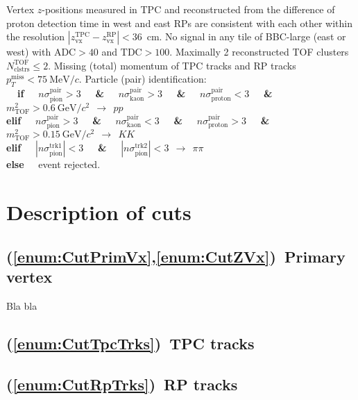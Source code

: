 \begin{enumerate}[label=C\arabic*]
\begin{enumerate}[label=\theenumi.\arabic*]
    \end{enumerate}
 \itemm Vertex $z$-positions measured in TPC and reconstructed from the difference of proton detection time in west and east RPs are consistent with each other within the resolution $|z_{\textrm{vx}}^{\textrm{TPC}}-z_{\textrm{vx}}^{\textrm{RP}}|<36$~cm.\label{enum:CutDeltaZVx}
 \itemm No signal in any tile of BBC-large (east or west) with $\textrm{ADC}>40$ and $\textrm{TDC}>100$.\label{enum:CutBbcLarge}
 \itemm Maximally 2 reconstructed TOF clusters $N^{\textrm{TOF}}_{\textrm{clstrs}}\leq 2$.\label{enum:CutTofClusters}
 \itemm Missing (total) momentum of TPC tracks and RP tracks $p_{T}^{\textrm{miss}}<75~\textrm{MeV}/c$.\label{enum:CutMissingPt}
 \itemm Particle (pair) identification:\label{enum:CutPid}\\
 \textbf{~~if~~} $n\sigma_{\textrm{pion}}^{\textrm{pair}}>3$ \textbf{~~\&~~} $n\sigma_{\textrm{kaon}}^{\textrm{pair}}>3$ \textbf{~~\&~~} $n\sigma_{\textrm{proton}}^{\textrm{pair}}<3$ \textbf{~~\&~~} $m^{2}_{\textrm{TOF}}>0.6~\textrm{GeV}/c^{2}~~\rightarrow~~pp$\\%
\textbf{elif~~} $n\sigma_{\textrm{pion}}^{\textrm{pair}}>3$ \textbf{~~\&~~} $n\sigma_{\textrm{kaon}}^{\textrm{pair}}<3$ \textbf{~~\&~~} $n\sigma_{\textrm{proton}}^{\textrm{pair}}>3$ \textbf{~~\&~~} $m^{2}_{\textrm{TOF}}>0.15~\textrm{GeV}/c^{2}~~\rightarrow~~KK$\\%
\textbf{elif~~} $|n\sigma_{\textrm{pion}}^{\textrm{trk1}}|<3$ \textbf{~~\&~~} $|n\sigma_{\textrm{pion}}^{\textrm{trk2}}|<3~~\rightarrow~~\pi\pi$\\%
\textbf{else~~} event rejected.
\end{enumerate}

\section{Description of cuts}\label{sec:descriptionOfCuts}
\subsection{(\ref{enum:CutPrimVx},\ref{enum:CutZVx})~Primary vertex}
Bla bla
\subsection{(\ref{enum:CutTpcTrks})~TPC tracks}
\subsection{(\ref{enum:CutRpTrks})~RP tracks}
